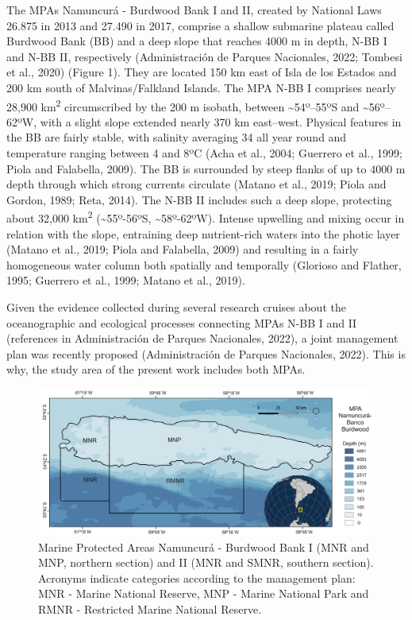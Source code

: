 \documentclass[preprint, 3p,
authoryear]{elsarticle} %
\begin{document}
The MPAs Namuncurá - Burdwood Bank I and II, created by National Laws
26.875 in 2013 and 27.490 in 2017, comprise a shallow submarine plateau
called Burdwood Bank (BB) and a deep slope that reaches 4000 m in depth,
N-BB I and N-BB II, respectively (Administración de Parques Nacionales,
2022; Tombesi et al., 2020) (Figure 1). They are located 150 km east of
Isla de los Estados and 200 km south of Malvinas/Falkland Islands. The
MPA N-BB I comprises nearly 28,900 km\textsuperscript{2} circumscribed
by the 200 m isobath, between \textasciitilde54º--55ºS and
\textasciitilde56º--62ºW, with a slight slope extended nearly 370 km
east--west. Physical features in the BB are fairly stable, with salinity
averaging 34 all year round and temperature ranging between 4 and 8ºC
(Acha et al., 2004; Guerrero et al., 1999; Piola and Falabella, 2009).
The BB is surrounded by steep flanks of up to 4000 m depth through which
strong currents circulate (Matano et al., 2019; Piola and Gordon, 1989;
Reta, 2014). The N-BB II includes such a deep slope, protecting about
32,000 km\textsuperscript{2} (\textasciitilde55º-56ºS,
\textasciitilde58º-62ºW). Intense upwelling and mixing occur in relation
with the slope, entraining deep nutrient-rich waters into the photic
layer (Matano et al., 2019; Piola and Falabella, 2009) and resulting in
a fairly homogeneous water column both spatially and temporally
(Glorioso and Flather, 1995; Guerrero et al., 1999; Matano et al.,
2019).

Given the evidence collected during several research cruises about the
oceanographic and ecological processes connecting MPAs N-BB I and II
(references in Administración de Parques Nacionales, 2022), a joint
management plan was recently proposed (Administración de Parques
Nacionales, 2022). This is why, the study area of the present work
includes both MPAs.

\begin{figure}
\includegraphics[width=1\linewidth]{MPABurdwood_map} \caption{Marine Protected Areas Namuncurá - Burdwood Bank I (MNR and MNP, northern section) and II (MNR and SMNR, southern section). Acronyms indicate categories according to the management plan: MNR - Marine National Reserve, MNP - Marine National Park and RMNR - Restricted Marine National Reserve.}\label{fig:figure1}
\end{figure}
\end{document}
